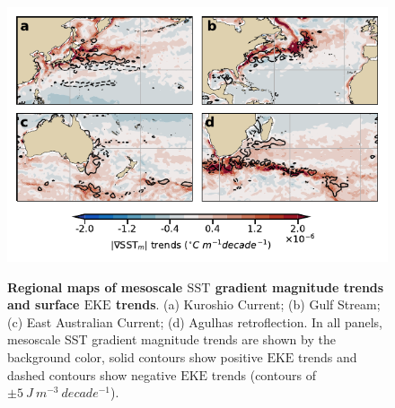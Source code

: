 \documentclass{nature}
\newcommand{\EKE}{\text{EKE}}
\newcommand{\SST}{\text{SST}}
\begin{document}
\begin{figure}
    \centering
	\includegraphics[width=\textwidth]{./figures/global_SST_small_scales_tke_trends.pdf}\\
	\caption{\textbf{Regional maps of mesoscale $\SST$ gradient magnitude trends and surface $\EKE$ trends}.  (a) Kuroshio Current; (b) Gulf Stream; (c) East Australian Current; (d) Agulhas retroflection. In all panels, mesoscale SST gradient magnitude trends are shown by the background color, solid contours show positive $\EKE$ trends and dashed contours show negative $\EKE$ trends (contours of $\pm 5\ J\ m^{-3}\ decade^{-1} $).  \label{fig:WBC_regional_small_scale_SST_grad}}
\end{figure}
\end{document}
